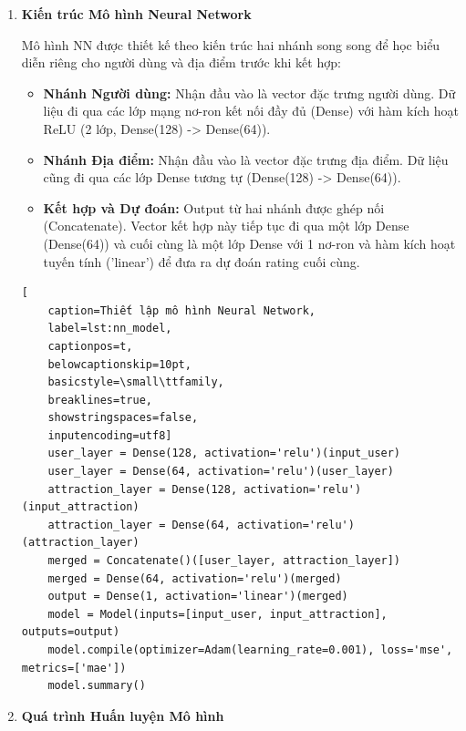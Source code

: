 \begin{enumerate}
    \item \textbf{Kiến trúc Mô hình Neural Network }

Mô hình NN được thiết kế theo kiến trúc hai nhánh song song để học biểu diễn riêng cho người dùng và địa điểm trước khi kết hợp:

\begin{itemize}
    \item \textbf{Nhánh Người dùng:} Nhận đầu vào là vector đặc trưng người dùng. Dữ liệu đi qua các lớp mạng nơ-ron kết nối đầy đủ (Dense) với hàm kích hoạt ReLU (2 lớp, Dense(128) -> Dense(64)).
    \item \textbf{Nhánh Địa điểm:} Nhận đầu vào là vector đặc trưng địa điểm. Dữ liệu cũng đi qua các lớp Dense tương tự (Dense(128) -> Dense(64)).
    \item \textbf{Kết hợp và Dự đoán:} Output từ hai nhánh được ghép nối (Concatenate). Vector kết hợp này tiếp tục đi qua một lớp Dense (Dense(64)) và cuối cùng là một lớp Dense với 1 nơ-ron và hàm kích hoạt tuyến tính ('linear') để đưa ra dự đoán rating cuối cùng.
\end{itemize}
\newpage
\lstset{language=python}
\begin{lstlisting}[
    caption=Thiết lập mô hình Neural Network,
    label=lst:nn_model,
    captionpos=t,
    belowcaptionskip=10pt,
    basicstyle=\small\ttfamily,
    breaklines=true,
    showstringspaces=false,
    inputencoding=utf8] 
    user_layer = Dense(128, activation='relu')(input_user)
    user_layer = Dense(64, activation='relu')(user_layer)
    attraction_layer = Dense(128, activation='relu')(input_attraction)
    attraction_layer = Dense(64, activation='relu')(attraction_layer)
    merged = Concatenate()([user_layer, attraction_layer])
    merged = Dense(64, activation='relu')(merged)
    output = Dense(1, activation='linear')(merged)
    model = Model(inputs=[input_user, input_attraction], outputs=output)
    model.compile(optimizer=Adam(learning_rate=0.001), loss='mse', metrics=['mae'])
    model.summary()

\end{lstlisting}
    
    \item \textbf{Quá trình Huấn luyện Mô hình}
   

\end{enumerate}
